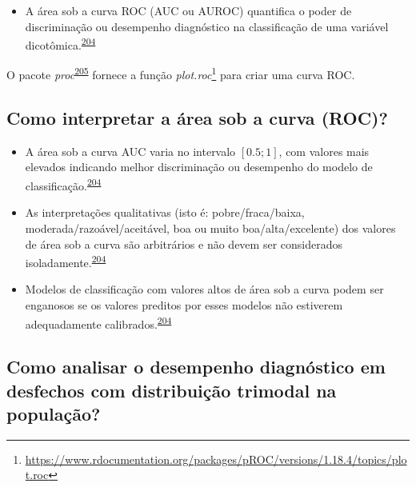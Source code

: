 \documentclass[
  a4paper,
]{book}
\providecommand{\tightlist}{%
  \setlength{\itemsep}{0pt}\setlength{\parskip}{0pt}}
\renewcommand{\href}[2]{#2\footnote{\url{#1}}}
\newenvironment{infobox}[1]
  {
  \begin{itemize}
  \renewcommand{\labelitemi}{
    \raisebox{-.7\height}[0pt][0pt]{
      {\setkeys{Gin}{width=3em,keepaspectratio}
        \texttt{[image: \#1]}}
    }
  }
  \setlength{\fboxsep}{1em}
  \begin{blackbox}
  \item
  }
  {
  \end{blackbox}
  \end{itemize}
  }
\begin{document}
\begin{itemize}
\tightlist
\item
  A área sob a curva ROC (AUC ou AUROC) quantifica o poder de discriminação ou desempenho diagnóstico na classificação de uma variável dicotômica.\textsuperscript{\protect\hyperlink{ref-de2022}{204}}
\end{itemize}

\begin{infobox}{images/Rlogo}
O pacote \emph{proc}\textsuperscript{\protect\hyperlink{ref-pROC}{205}} fornece a função \href{https://www.rdocumentation.org/packages/pROC/versions/1.18.4/topics/plot.roc}{\emph{plot.roc}} para criar uma curva ROC.

\end{infobox}

\hypertarget{como-interpretar-a-uxe1rea-sob-a-curva-roc}{%
\subsection{Como interpretar a área sob a curva (ROC)?}\label{como-interpretar-a-uxe1rea-sob-a-curva-roc}}

\begin{itemize}
\item
  A área sob a curva AUC varia no intervalo \([0.5; 1]\), com valores mais elevados indicando melhor discriminação ou desempenho do modelo de classificação.\textsuperscript{\protect\hyperlink{ref-de2022}{204}}
\item
  As interpretações qualitativas (isto é: pobre/fraca/baixa, moderada/razoável/aceitável, boa ou muito boa/alta/excelente) dos valores de área sob a curva são arbitrários e não devem ser considerados isoladamente.\textsuperscript{\protect\hyperlink{ref-de2022}{204}}
\item
  Modelos de classificação com valores altos de área sob a curva podem ser enganosos se os valores preditos por esses modelos não estiverem adequadamente calibrados.\textsuperscript{\protect\hyperlink{ref-de2022}{204}}
\end{itemize}

\hypertarget{como-analisar-o-desempenho-diagnuxf3stico-em-desfechos-com-distribuiuxe7uxe3o-trimodal-na-populauxe7uxe3o}{%
\subsection{Como analisar o desempenho diagnóstico em desfechos com distribuição trimodal na população?}\label{como-analisar-o-desempenho-diagnuxf3stico-em-desfechos-com-distribuiuxe7uxe3o-trimodal-na-populauxe7uxe3o}}
\end{document}
